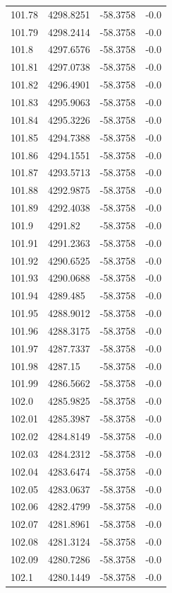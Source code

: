 \begin{table}[H]
\begin{tabular}{llll}
101.78 & 4298.8251 & -58.3758 & -0.0 \\
101.79 & 4298.2414 & -58.3758 & -0.0 \\
101.8 & 4297.6576 & -58.3758 & -0.0 \\
101.81 & 4297.0738 & -58.3758 & -0.0 \\
101.82 & 4296.4901 & -58.3758 & -0.0 \\
101.83 & 4295.9063 & -58.3758 & -0.0 \\
101.84 & 4295.3226 & -58.3758 & -0.0 \\
101.85 & 4294.7388 & -58.3758 & -0.0 \\
101.86 & 4294.1551 & -58.3758 & -0.0 \\
101.87 & 4293.5713 & -58.3758 & -0.0 \\
101.88 & 4292.9875 & -58.3758 & -0.0 \\
101.89 & 4292.4038 & -58.3758 & -0.0 \\
101.9 & 4291.82 & -58.3758 & -0.0 \\
101.91 & 4291.2363 & -58.3758 & -0.0 \\
101.92 & 4290.6525 & -58.3758 & -0.0 \\
101.93 & 4290.0688 & -58.3758 & -0.0 \\
101.94 & 4289.485 & -58.3758 & -0.0 \\
101.95 & 4288.9012 & -58.3758 & -0.0 \\
101.96 & 4288.3175 & -58.3758 & -0.0 \\
101.97 & 4287.7337 & -58.3758 & -0.0 \\
101.98 & 4287.15 & -58.3758 & -0.0 \\
101.99 & 4286.5662 & -58.3758 & -0.0 \\
102.0 & 4285.9825 & -58.3758 & -0.0 \\
102.01 & 4285.3987 & -58.3758 & -0.0 \\
102.02 & 4284.8149 & -58.3758 & -0.0 \\
102.03 & 4284.2312 & -58.3758 & -0.0 \\
102.04 & 4283.6474 & -58.3758 & -0.0 \\
102.05 & 4283.0637 & -58.3758 & -0.0 \\
102.06 & 4282.4799 & -58.3758 & -0.0 \\
102.07 & 4281.8961 & -58.3758 & -0.0 \\
102.08 & 4281.3124 & -58.3758 & -0.0 \\
102.09 & 4280.7286 & -58.3758 & -0.0 \\
102.1 & 4280.1449 & -58.3758 & -0.0 \\

\end{tabular}
\end{table}
